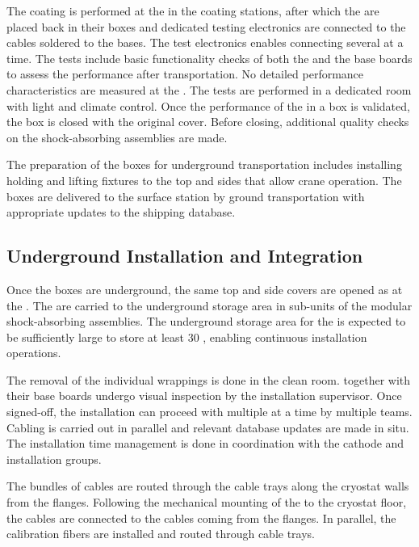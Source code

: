The  coating is performed at the  in the coating stations, after which  the  are placed back in their boxes and dedicated testing electronics are connected to the  cables soldered to the  bases. The test electronics enables connecting several  at a time. The tests include basic functionality checks of both the  and the base boards to assess the performance after transportation. No detailed performance characteristics are measured at the . The tests are performed in a dedicated room with light and climate control. Once the performance of the  in a box is validated, the box is closed with the original cover. Before closing, additional quality checks on the shock-absorbing assemblies are made.

The preparation of the  boxes for underground transportation includes installing holding and lifting fixtures to the top and sides %
that allow crane operation. The boxes are delivered to the surface station by ground transportation with %
appropriate updates to the shipping database.

\subsection{Underground Installation and Integration}
\label{sec:fddp-pd-9.3}

Once the  boxes are underground, the same top and side covers are opened as at the . The  are carried to the underground storage area in sub-units of the modular shock-absorbing assemblies. The underground storage area for the  is expected to be sufficiently large to store at least \num{30} , enabling continuous installation operations.

The removal of the individual  wrappings is done in the clean room.  together with their base boards undergo visual inspection by the  installation supervisor. Once signed-off, the installation can proceed with multiple  at a time by multiple teams. Cabling is carried out in parallel and relevant database updates are made in situ. The installation time management is done in coordination with the cathode and  installation groups.

The bundles of cables are routed through the cable trays along the cryostat walls from the  flanges. Following the mechanical mounting of the  to the cryostat floor, the  cables are 
connected to the cables coming from the flanges. In parallel, the calibration fibers are installed and routed through cable trays.

